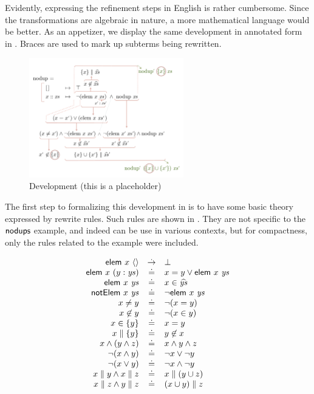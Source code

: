 \bigskip
Evidently, expressing the refinement steps in English is rather cumbersome.
Since the transformations are algebraic in nature, a more mathematical
language would be better.
As an appetizer, we display the same development in annotated form in
.
Braces are used to mark up subterms being rewritten.

\begin{figure}[b]
\includegraphics[width=0.6\textwidth]{gfx/nodup-1-placeholder}
\caption{\label{nodups:proof-sketch-1} Development (this is a placeholder)}
\end{figure}

The first step to formalizing this development in \TransCal is to have
some basic theory expressed by rewrite rules.
Such rules are shown in .
They are not specific to the $\mathsf{nodups}$ example, and indeed can be use
in various contexts,
but for compactness, only the rules related to the example were included.

\begin{table}
\[\begin{array}{rcl}
    \mathsf{elem}~x~\langle\rangle       & \overset{.}{\to} &  \bot                   \\
    \mathsf{elem}~x~(y:\mathit{ys})     & \doteq &  x=y \lor \mathsf{elem}~x~\mathit{ys}   \\
    \mathsf{elem}~x~\mathit{ys}         & \doteq &  x \in \widehat{\mathit{ys}}    \\
    \mathsf{notElem}~x~\mathit{ys}      & \doteq &  \lnot \mathsf{elem}~x~\mathit{ys}      \\
    x\neq y             & \doteq &  \lnot(x = y)           \\
    x\not\in y          & \doteq &  \lnot(x \in y)         \\
    x \in \{y\}         & \doteq &  x = y                  \\
    x \parallel \{y\}   & \doteq &  y \not\in x            \\
    x \land (y\land z)  & \doteq &  x\land y\land z        \\
    \lnot(x\land y)     & \doteq &  \lnot x \lor \lnot y   \\
    \lnot(x\lor y)      & \doteq &  \lnot x \land \lnot y  \\
    x\parallel y \land
    x\parallel z        & \doteq &  x \parallel (y\cup z)  \\
    x\parallel z \land
    y\parallel z        & \doteq &  (x\cup y) \parallel z  \\
  \end{array}\]
\caption{\label{basic-rules}}
\end{table}

